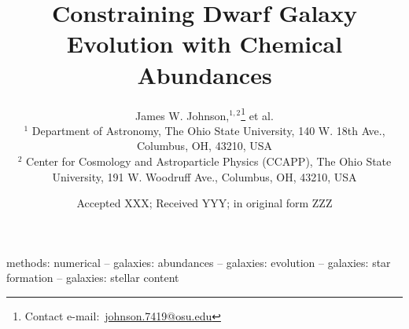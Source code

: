 \documentclass[fleqn, usenatbib]{mnras}
\title[One-Zone Models of Dwarf Galaxies]{Constraining Dwarf Galaxy Evolution
with Chemical Abundances}
\author[J.W. Johnson et al.]{James W. Johnson,$^{1, 2}$\thanks{
	Contact e-mail:~\href{mailto:johnson.7419@osu.edu}{johnson.7419@osu.edu}}
	et al.
	\\
	$^{1}$ Department of Astronomy, The Ohio State University,
	140 W. 18th Ave., Columbus, OH, 43210, USA
	\\
	$^{2}$ Center for Cosmology and Astroparticle Physics (CCAPP),
	The Ohio State University, 191 W. Woodruff Ave., Columbus, OH, 43210, USA
}
\date{Accepted XXX; Received YYY; in original form ZZZ}
\begin{document}
\label{firstpage}
\pagerange{\pageref{firstpage}--\pageref{lastpage}}
\maketitle



\begin{keywords}
methods: numerical -- galaxies: abundances -- galaxies: evolution --
galaxies: star formation -- galaxies: stellar content
\end{keywords}













\begin{appendices}


\end{appendices}

\label{lastpage}
\end{document}
